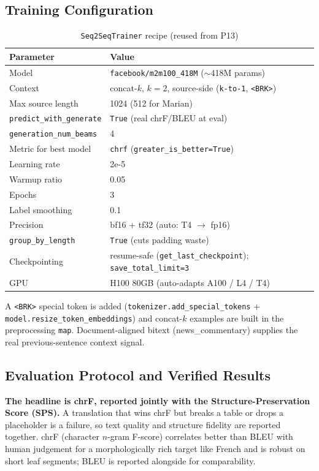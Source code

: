 \documentclass[12pt,a4paper]{article}
\begin{document}
\subsection{Training Configuration}

\begin{table}[H]
\centering
\caption{\texttt{Seq2SeqTrainer} recipe (reused from P13)}
\begin{tabular}{ll}
\toprule
\textbf{Parameter} & \textbf{Value} \\
\midrule
Model & \texttt{facebook/m2m100\_418M} ($\sim$418M params) \\
Context & concat-$k$, $k=2$, source-side (\texttt{k-to-1}, \texttt{<BRK>}) \\
Max source length & 1024 (512 for Marian) \\
\texttt{predict\_with\_generate} & \texttt{True} (real chrF/BLEU at eval) \\
\texttt{generation\_num\_beams} & 4 \\
Metric for best model & \texttt{chrf} (\texttt{greater\_is\_better=True}) \\
Learning rate & 2e-5 \\
Warmup ratio & 0.05 \\
Epochs & 3 \\
Label smoothing & 0.1 \\
Precision & bf16 + tf32 (auto: T4 $\rightarrow$ fp16) \\
\texttt{group\_by\_length} & \texttt{True} (cuts padding waste) \\
Checkpointing & resume-safe (\texttt{get\_last\_checkpoint}); \texttt{save\_total\_limit=3} \\
GPU & H100 80GB (auto-adapts A100 / L4 / T4) \\
\bottomrule
\end{tabular}
\end{table}

A \texttt{<BRK>} special token is added (\texttt{tokenizer.add\_special\_tokens} + \texttt{model.resize\_token\_embeddings}) and concat-$k$ examples are built in the preprocessing \texttt{map}. Document-aligned bitext (news\_commentary) supplies the real previous-sentence context signal.

\subsection{Evaluation Protocol and Verified Results}

\textbf{The headline is chrF, reported jointly with the Structure-Preservation Score (SPS).} A translation that wins chrF but breaks a table or drops a placeholder is a failure, so text quality and structure fidelity are reported together. chrF (character $n$-gram F-score) correlates better than BLEU with human judgement for a morphologically rich target like French and is robust on short leaf segments; BLEU is reported alongside for comparability.
\end{document}
